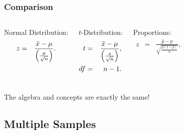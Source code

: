 \begin{frame}
  \frametitle{Comparison}

  \begin{columns}
    Normal Distribution:
    \begin{eqnarray*}
      z &  = & \frac{\bar{x}-\mu}{\left( \frac{\sigma}{\sqrt{n}} \right)}.
    \end{eqnarray*}

    $t$-Distribution:
    \begin{eqnarray*}
      t &  = & \frac{\bar{x}-\mu}{\left( \frac{s}{\sqrt{n}} \right)}, \\
      df & = & n-1.
    \end{eqnarray*}

    Proportions:
    \begin{eqnarray*}
      z & = & \frac{\hat{p}-p}{\sqrt{\frac{p(1-p)}{n}}},
    \end{eqnarray*}


  \end{columns}

  \vfill

    {
      \begin{center}
        The algebra and concepts are exactly the same!
      \end{center}
    }

    \vfill
  

\end{frame}


\subsection{Multiple Samples}


